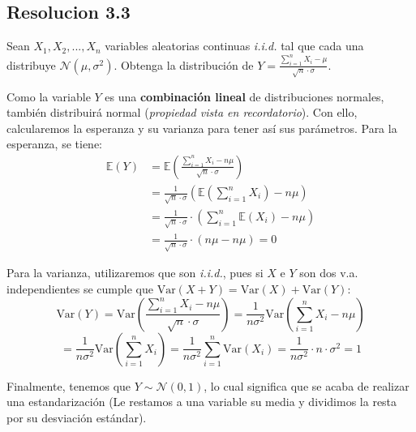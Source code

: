 \documentclass[
  11pt,
  letterpaper,
   addpoints,
   answers
  ]{exam}
\begin{document}
\begin{questions}
\begin{solution}
\subsection*{Resolucion 3.3}
Sean \( X_1, X_2, ..., X_n \) variables aleatorias continuas \textit{i.i.d.} tal que cada una distribuye \( \mathcal{N}(\mu, \sigma^2) \). Obtenga la distribución de 
    $
    Y = \frac{\sum_{i=1}^{n} X_i - \mu}{\sqrt{n} \cdot \sigma}.
    $

Como la variable \( Y \) es una \textbf{combinación lineal} de distribuciones normales, también distribuirá normal (\textit{propiedad vista en recordatorio}). Con ello, calcularemos la esperanza y su varianza para tener así sus parámetros. Para la esperanza, se tiene:
\begin{align*}
\mathbb{E}(Y) &= \mathbb{E}\left( \frac{\sum_{i=1}^{n} X_i - n\mu}{\sqrt{n} \cdot \sigma} \right) \\
&= \frac{1}{\sqrt{n} \cdot \sigma} \left( \mathbb{E}\left( \sum_{i=1}^{n} X_i \right) - n\mu \right) \\
&= \frac{1}{\sqrt{n} \cdot \sigma} \cdot \left( \sum_{i=1}^{n} \mathbb{E}(X_i) - n\mu \right) \\
&= \frac{1}{\sqrt{n} \cdot \sigma} \cdot (n\mu - n\mu) = 0
\end{align*}

Para la varianza, utilizaremos que son \textit{i.i.d.}, pues si \( X \) e \( Y \) son dos v.a. independientes se cumple que \( \text{Var}(X + Y) = \text{Var}(X) + \text{Var}(Y) \):
\[
\text{Var}(Y) = \text{Var}\left( \frac{\sum_{i=1}^{n} X_i - n\mu}{\sqrt{n} \cdot \sigma} \right) = \frac{1}{n\sigma^2} \text{Var}\left( \sum_{i=1}^{n} X_i - n\mu \right)
\]
\[
= \frac{1}{n\sigma^2} \text{Var}\left( \sum_{i=1}^{n} X_i \right) = \frac{1}{n\sigma^2} \sum_{i=1}^{n} \text{Var}(X_i) = \frac{1}{n\sigma^2} \cdot n \cdot \sigma^2 = 1
\]

Finalmente, tenemos que \( Y \sim \mathcal{N}(0, 1) \), lo cual significa que se acaba de realizar una estandarización (Le restamos a una variable su media y dividimos la resta por su desviación estándar).
\end{solution}
\end{questions}
\end{document}
